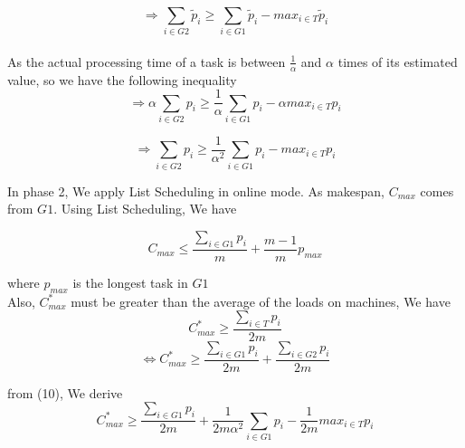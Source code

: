 \documentclass[10pt, conference, compsocconf]{IEEEtran}
\begin{document}
\begin{equation}\nonumber 
\Rightarrow \sum_{i \in G2 }^{}{\tilde p_{i}} \geq \sum_{i \in G1 }^{}{\tilde p_{i}} - {max_{i \in T}}{\tilde p_{i}}\end{equation}
\\
As the actual processing time of a task is between $\frac{1}{\alpha}$ and $\alpha$ times of its estimated value, so we have the following inequality\\
\begin{equation}\nonumber 
\Rightarrow \alpha\sum_{i \in G2 }^{}{{p_{i}}} \geq  {\frac{1}{\alpha}} \sum_{i \in G1 }^{}{{p_{i}}} - \alpha {max_{i \in T}}{{p_{i}}}
\end{equation}

\begin{equation}
\Rightarrow \sum_{i \in G2 }^{}{{p_{i}}} \geq {\frac{1}{\alpha^{2}}} \sum_{i \in G1 }^{}{{p_{i}}} - {max_{i \in T}}{{p_{i}}}
\end{equation}




In phase 2, We  apply List Scheduling in online mode. As makespan, $C_{max}$ comes from $G1$. Using List Scheduling, We have

\begin{equation}
 C_{max} \leq \frac{\sum_{i \in G1 }^{}{{p_{i}}}}{m} + {\frac{m-1}{m}} p_{max} 
\end{equation}

where $p_{max}$ is the longest task in $G1$
\\

Also, $C_{max}^{*}$ must be greater than the average of the  loads on  machines, We have\\

\begin{equation}\nonumber 
C_{max}^{*} \geq  \frac{\sum_{i \in T }^{}{{p_{i}}}}{2m}
\end{equation}
\begin{equation}\nonumber
\Leftrightarrow C_{max}^{*}\geq  \frac{\sum_{i \in G1 }^{}{{p_{i}}}}{2m} + \frac{\sum_{i \in G2 }^{}{{p_{i}}}}{2m} \end{equation}

from (10), We derive\\
\begin{equation}\nonumber
C_{max}^{*} \geq  \frac{\sum_{i \in G1 }^{}{{p_{i}}}}{2m} + {\frac{1}{2m\alpha^{2}}} \sum_{i \in G1 }^{}{{p_{i}}} - {\frac{1}{2m}}{max_{i \in T}}{{p_{i}}} 
\end{equation}
\end{document}
